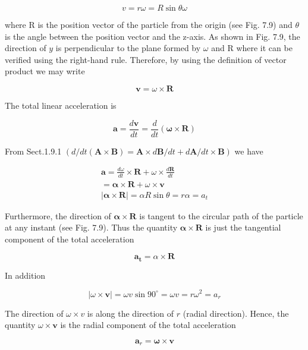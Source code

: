 \documentclass[10pt]{article}
\begin{document}
$$
v=r \omega=R \sin \theta \omega
$$

where R is the position vector of the particle from the origin (see Fig. 7.9) and $\theta$ is the angle between the position vector and the z-axis. As shown in Fig. 7.9, the direction of $y$ is perpendicular to the plane formed by $\omega$ and R where it can be verified using the right-hand rule. Therefore, by using the definition of vector product we may write


\begin{equation*}
\mathbf{v}=\omega \times \mathbf{R} \tag{7.7}
\end{equation*}


The total linear acceleration is

$$
\mathbf{a}=\frac{d \mathbf{v}}{d t}=\frac{d}{d t}(\boldsymbol{\omega} \times \mathbf{R})
$$

From Sect.1.9.1 $(d / d t(\mathbf{A} \times \mathbf{B})=\mathbf{A} \times d \mathbf{B} / d t+d \mathbf{A} / d t \times \mathbf{B})$ we have

$$
\begin{gathered}
\mathbf{a}=\frac{d \omega}{d t} \times \mathbf{R}+\omega \times \frac{d \mathbf{R}}{d t} \\
=\boldsymbol{\alpha} \times \mathbf{R}+\omega \times \mathbf{v} \\
|\boldsymbol{\alpha} \times \mathbf{R}|=\alpha R \sin \theta=r \alpha=a_{t}
\end{gathered}
$$

Furthermore, the direction of $\boldsymbol{\alpha} \times \mathbf{R}$ is tangent to the circular path of the particle at any instant (see Fig. 7.9). Thus the quantity $\boldsymbol{\alpha} \times \mathbf{R}$ is just the tangential component of the total acceleration


\begin{equation*}
\mathbf{a}_{\mathbf{t}}=\alpha \times \mathbf{R} \tag{7.8}
\end{equation*}


In addition

$$
|\omega \times \mathbf{v}|=\omega v \sin 90^{\circ}=\omega v=r \omega^{2}=a_{r}
$$

The direction of $\omega \times v$ is along the direction of $r$ (radial direction). Hence, the quantity $\omega \times \mathbf{v}$ is the radial component of the total acceleration


\begin{equation*}
\mathbf{a}_{r}=\boldsymbol{\omega} \times \mathbf{v} \tag{7.9}
\end{equation*}
\end{document}
